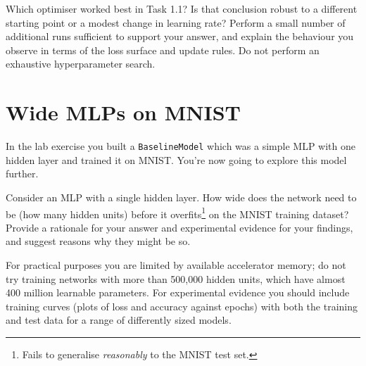 \documentclass[a4paper]{article}
\begin{document}
\begin{tcolorbox}[title=1.2 Interpret the optimiser behaviour (2 marks)]
Which optimiser worked best in Task 1.1? Is that conclusion robust to a different starting point or a modest change in learning rate? Perform a small number of additional runs sufficient to support your answer, and explain the behaviour you observe in terms of the loss surface and update rules. Do not perform an exhaustive hyperparameter search.
\end{tcolorbox}

\section{Wide MLPs on MNIST}

In the lab exercise you built a \texttt{BaselineModel} which was a simple MLP with one hidden layer and trained it on MNIST. You're now going to explore this model further.

\begin{tcolorbox}[title=2.1 Wider MLPs (5 marks)]
Consider an MLP with a single hidden layer. How wide does the network need to be (how many hidden units) before it overfits\footnote{Fails to generalise \emph{reasonably} to the MNIST test set.} on the MNIST training dataset? Provide a rationale for your answer and experimental evidence for your findings, and suggest reasons why they might be so.

For practical purposes you are limited by available accelerator memory; do not try training networks with more than 500,000 hidden units, which have almost 400 million learnable parameters. For experimental evidence you should include training curves (plots of loss and accuracy against epochs) with both the training and test data for a range of differently sized models.
\end{tcolorbox}
\end{document}
